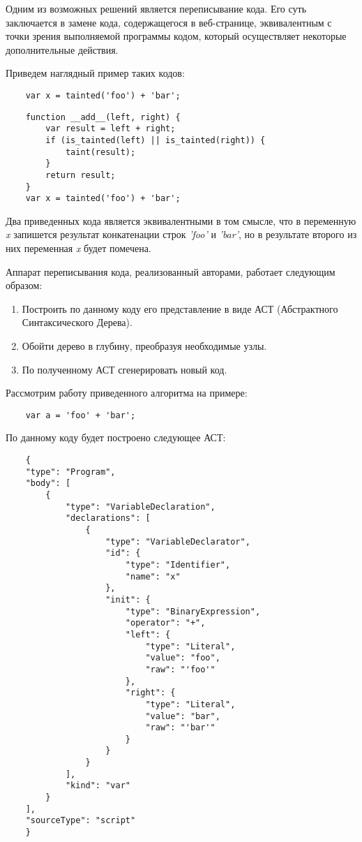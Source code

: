 Одним из возможных решений является переписывание кода. Его суть заключается в замене кода, содержащегося в веб-странице, эквивалентным с точки зрения выполняемой программы кодом, который осуществляет некоторые дополнительные действия.


Приведем наглядный пример таких кодов:

\bigskip
\begin{lstlisting}
	var x = tainted('foo') + 'bar';
\end{lstlisting}


\begin{lstlisting}
	function __add__(left, right) {
		var result = left + right;
		if (is_tainted(left) || is_tainted(right)) {
			taint(result);
		}
		return result;
	}
	var x = tainted('foo') + 'bar';
\end{lstlisting}


Два приведенных кода является эквивалентными в том смысле, что в переменную \textit{x} запишется результат конкатенации строк \textit{'foo'} и \textit{'bar'}, но в результате второго из них переменная \textit{x} будет помечена.


Аппарат переписывания кода, реализованный авторами, работает следующим образом:


\begin{enumerate}
	\item Построить по данному коду его представление в виде АСТ (Абстрактного Синтаксического Дерева).
	\item Обойти дерево в глубину, преобразуя необходимые узлы.
	\item По полученному АСТ сгенерировать новый код.
\end{enumerate}


Рассмотрим работу приведенного алгоритма на примере:

\bigskip
\begin{lstlisting}
	var a = 'foo' + 'bar';
\end{lstlisting}


По данному коду будет построено следующее АСТ:

\bigskip
\begin{lstlisting}
	{
    "type": "Program",
    "body": [
        {
            "type": "VariableDeclaration",
            "declarations": [
                {
                    "type": "VariableDeclarator",
                    "id": {
                        "type": "Identifier",
                        "name": "x"
                    },
                    "init": {
                        "type": "BinaryExpression",
                        "operator": "+",
                        "left": {
                            "type": "Literal",
                            "value": "foo",
                            "raw": "'foo'"
                        },
                        "right": {
                            "type": "Literal",
                            "value": "bar",
                            "raw": "'bar'"
                        }
                    }
                }
            ],
            "kind": "var"
        }
    ],
    "sourceType": "script"
	}
\end{lstlisting}


